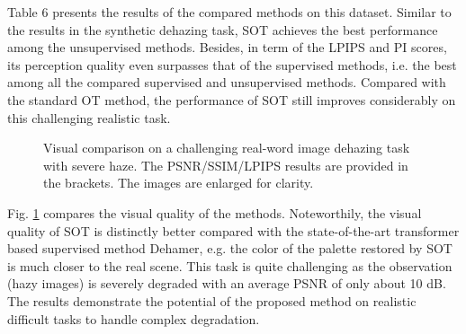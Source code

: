 \documentclass[10pt,journal,compsoc]{IEEEtran}
\begin{document}
Table 6 presents the results of the compared methods on this dataset.
Similar to the results in the synthetic dehazing task, SOT achieves the 
best performance among the unsupervised methods. Besides, in term of the
LPIPS and PI scores, its perception quality even surpasses that of the 
supervised methods, i.e. the best among all the compared supervised and 
unsupervised methods. Compared with the standard OT method, the performance 
of SOT still improves considerably on this challenging realistic task.

\begin{figure}[!t]
	\centering
	\caption{Visual comparison on a challenging real-word image dehazing task with severe haze. The PSNR/SSIM/LPIPS results are provided in the brackets. The images are enlarged for clarity.}
	\label{figure7}
\end{figure}

Fig. \ref{figure7} compares the visual quality of the methods. 
Noteworthily, the visual quality of SOT is distinctly better 
compared with the state-of-the-art transformer based supervised method Dehamer,
e.g. the color of the palette restored by SOT is much closer to the real scene.
This task is quite challenging as the observation (hazy images) 
is severely degraded with an average PSNR of only about 10 dB.
The results demonstrate the potential of the proposed method
on realistic difficult tasks to handle complex degradation.

\end{document}
